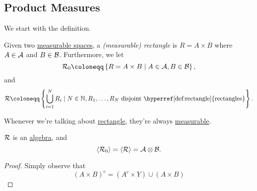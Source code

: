 \subsection{Product Measures}
We start with the definition.
\begin{definition}[Rectangle]\label{def:rectangle}
  Given two \hyperref[def:measurable-space]{measurable spaces}, a \emph{(measurable) rectangle} is \(R = A\times B\) where \(A\in \mathcal{\MakeUppercase{a}} \)
  and \(B\in \mathcal{\MakeUppercase{b}} \). Furthermore, we let
  \[
    \mathcal{\MakeUppercase{r}} _0 \coloneqq \left\{R = A\times B \mid A\in \mathcal{\MakeUppercase{a}} , B\in \mathcal{\MakeUppercase{b}} \right\},
  \]
  and
  \[
    \mathcal{\MakeUppercase{r}} \coloneqq \left\{\bigcup\limits_{i=1}^{N} R_{i} \mid N\in \mathbb{\MakeUppercase{n}} , R_1, \ldots , R_N \text{ disjoint \hyperref[def:rectangle]{rectangles}}\right\}.
  \]
\end{definition}
\begin{note}
  Whenever we're talking about \hyperref[def:rectangle]{rectangle}, they're always \hyperref[def:measurable-set]{measurable}.
\end{note}

\begin{lemma}
  \(\mathcal{\MakeUppercase{r}} \) is an \hyperref[def:algebra]{algebra}, and
  \[
    \left< \mathcal{\MakeUppercase{r}} _0 \right> = \left< \mathcal{\MakeUppercase{r}}  \right> = \mathcal{\MakeUppercase{a}} \otimes \mathcal{\MakeUppercase{b}}.
  \]
\end{lemma}
\begin{proof}
  Simply observe that
  \[
    (A\times B)^{c} = (A^{c} \times Y)\cup (A\times B)
  \]
\end{proof}